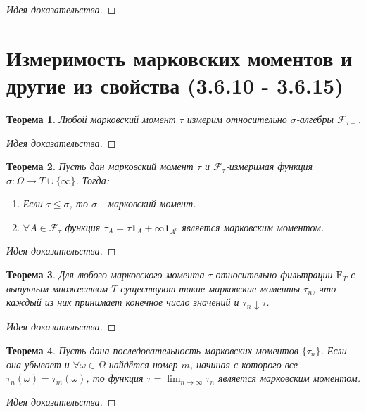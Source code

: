 \documentclass[16pt]{article}
\newtheorem{theorem}{Теорема}[section]
\theoremstyle{definition}
\begin{document}
\begin{proof}[Идея доказательства]

\end{proof}

\section{Измеримость марковских моментов и другие из свойства (3.6.10 - 3.6.15)}
\begin{theorem}
Любой марковский момент $\tau$ измерим относительно $\sigma$-алгебры $\mathcal{F}_{\tau-}$.
\end{theorem}
\begin{proof}[Идея доказательства]

\end{proof}
\begin{theorem}
Пусть дан марковский момент $\tau$ и $\mathcal{F}_\tau$-измеримая функция $\sigma: \Omega \rightarrow T \cup \{\infty\}$. Тогда:
\begin{enumerate}
    \item Если $\tau \le \sigma$, то $\sigma$ - марковский момент.
    \item $\forall A \in \mathcal{F}_\tau$ функция $\tau_A = \tau\mathbf{1}_A + \infty\mathbf{1}_{A^c}$ является марковским моментом.
\end{enumerate}
\end{theorem}
\begin{proof}[Идея доказательства]

\end{proof}
\begin{theorem}
Для любого марковского момента $\tau$ относительно фильтрации $\mathrm{F}_T$ с выпуклым множеством $T$ существуют такие марковские моменты $\tau_n$, что каждый из них принимает конечное число значений и $\tau_n \downarrow \tau$.
\end{theorem}
\begin{proof}[Идея доказательства]

\end{proof}
\begin{theorem}
Пусть дана последовательность марковских моментов $\{\tau_n\}$. Если она убывает и $\forall \omega \in \Omega$ найдётся номер $m$, начиная с которого все $\tau_n(\omega) = \tau_m(\omega)$, то функция $\tau = \lim_{n \rightarrow \infty}\tau_n$ является марковским моментом.
\end{theorem}
\begin{proof}[Идея доказательства]

\end{proof}
\end{document}
